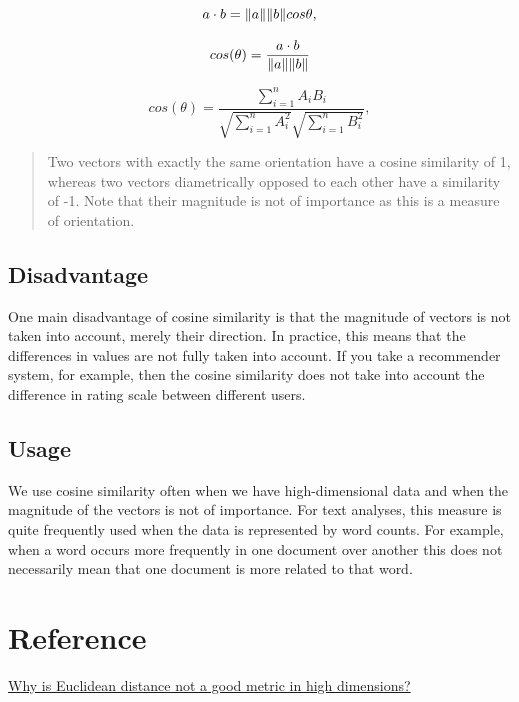 \documentclass[11pt]{article}
\begin{document}
$$
a \cdot b = \|a\| \space \|b\| \space cos \theta,
$$

$$
cos(\theta) = \frac{a \cdot b}{\|a\| \space \|b\|}
$$

$$
cos(\theta) = \frac{\displaystyle\sum_{i = 1}^n A_iB_i}{\sqrt{\displaystyle\sum_{i = 1}^n A_i^2}\sqrt{\displaystyle\sum_{i = 1}^n B_i^2}},
$$

\begin{quote}
Two vectors with exactly the same orientation have a cosine similarity
of 1, whereas two vectors diametrically opposed to each other have a
similarity of -1. Note that their magnitude is not of importance as
this is a measure of orientation.
\end{quote}

\subsection{Disadvantage}
\label{sec:orgf6110a7}
One main disadvantage of cosine similarity is that the magnitude of
vectors is not taken into account, merely their direction. In practice,
this means that the differences in values are not fully taken into
account. If you take a recommender system, for example, then the cosine
similarity does not take into account the difference in rating scale
between different users.

\subsection{Usage}
\label{sec:orgf79566d}
We use cosine similarity often when we have high-dimensional data and
when the magnitude of the vectors is not of importance. For text
analyses, this measure is quite frequently used when the data is
represented by word counts. For example, when a word occurs more
frequently in one document over another this does not necessarily mean
that one document is more related to that word.

\section{Reference}
\label{sec:orgef0e0bd}
\href{https://stats.stackexchange.com/questions/99171/why-is-euclidean-distance-not-a-good-metric-in-high-dimensions}{Why is Euclidean distance not a good metric in high dimensions?}
\end{document}
